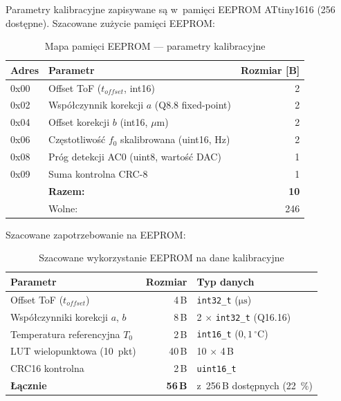 \documentclass[a4paper,11pt]{article}
\begin{document}
Parametry kalibracyjne zapisywane są w~pamięci EEPROM ATtiny1616
(\SI{256}{\byte} dostępne). Szacowane zużycie pamięci EEPROM:

\begin{table}[H]
    \centering
    \caption{Mapa pamięci EEPROM --- parametry kalibracyjne}
    \label{tab:eeprom_map}
    \begin{tabular}{llr}
        \toprule
        \textbf{Adres} & \textbf{Parametr} & \textbf{Rozmiar [B]} \\
        \midrule
        0x00 & Offset ToF ($t_{offset}$, int16) & 2 \\
        0x02 & Współczynnik korekcji $a$ (Q8.8 fixed-point) & 2 \\
        0x04 & Offset korekcji $b$ (int16, $\mu$m) & 2 \\
        0x06 & Częstotliwość $f_0$ skalibrowana (uint16, Hz) & 2 \\
        0x08 & Próg detekcji AC0 (uint8, wartość DAC) & 1 \\
        0x09 & Suma kontrolna CRC-8 & 1 \\
        \midrule
        & \textbf{Razem:} & \textbf{10} \\
        & Wolne: & 246 \\
        \bottomrule
    \end{tabular}
\end{table} Szacowane zapotrzebowanie na EEPROM:

\begin{table}[H]
    \centering
    \caption{Szacowane wykorzystanie EEPROM na dane kalibracyjne}
    \label{tab:eeprom_usage}
    \begin{tabular}{lrl}
        \toprule
        \textbf{Parametr} & \textbf{Rozmiar} & \textbf{Typ danych} \\
        \midrule
        Offset ToF ($t_{offset}$) & 4\,B & \texttt{int32\_t} ($\si{\micro\second}$) \\
        Współczynniki korekcji $a$, $b$ & 8\,B & 2 $\times$ \texttt{int32\_t} (Q16.16) \\
        Temperatura referencyjna $T_0$ & 2\,B & \texttt{int16\_t} ($0{,}1\,^\circ$C) \\
        LUT wielopunktowa (10~pkt) & 40\,B & 10 $\times$ 4\,B \\
        CRC16 kontrolna & 2\,B & \texttt{uint16\_t} \\
        \midrule
        \textbf{Łącznie} & \textbf{56\,B} & z~256\,B dostępnych (\SI{22}{\percent}) \\
        \bottomrule
    \end{tabular}
\end{table}
\end{document}
